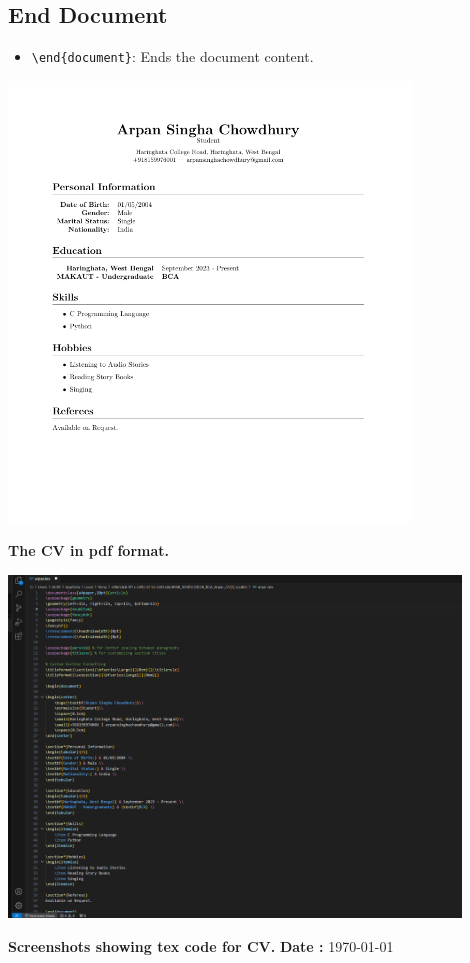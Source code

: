 \documentclass[a4paper,12pt]{article}
\begin{document}
\subsection{End Document}
\begin{itemize}
    \item \texttt{\textbackslash end\{document\}}: Ends the document content.
    \end{itemize}
\includegraphics[width=0.8\textwidth]{arpancv.png}
\par\vspace{2em}
\large\textbf{The CV in pdf format.}
\par\vspace{2em}
\includegraphics[width=0.9\textwidth]{arpancvtex.png}
\par\vspace{2em}
\large\textbf{Screenshots showing tex code for CV.}
\vspace{0.3in}
\newpage
{\textbf{Date :} \today}
\end{document}

